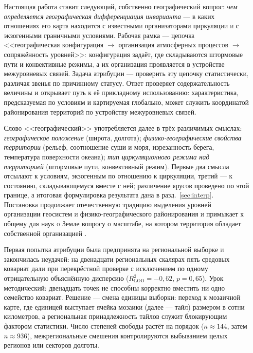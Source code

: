 \documentclass[11pt,a4paper]{article}
\begin{document}
Настоящая работа ставит следующий, собственно географический вопрос: \emph{чем определяется географическая дифференциация инварианта} --- в каких отношениях его карта находится с известными организаторами циркуляции и с экзогенными граничными условиями. Рабочая рамка --- цепочка <<географическая конфигурация $\to$ организация атмосферных процессов $\to$ сопряжённость уровней>>: конфигурация задаёт, где складываются штормовые пути и конвективные режимы, а их организация проявляется в устройстве межуровневых связей. Задача атрибуции --- проверить эту цепочку статистически, различая звенья по причинному статусу. Ответ проверяет содержательность величины и открывает путь к её прикладному использованию: характеристика, предсказуемая по условиям и картируемая глобально, может служить координатой районирования территорий по устройству межуровневых связей.

Слово <<географический>> употребляется далее в трёх различимых смыслах: \emph{географическое положение} (широта, долгота); \emph{физико-географические свойства территории} (рельеф, соотношение суши и моря, изрезанность берега, температура поверхности океана); \emph{тип циркуляционного режима над территорией} (штормовые пути, конвективный режим). Первые два смысла отсылают к условиям, экзогенным по отношению к циркуляции, третий --- к состоянию, складывающемуся вместе с ней; различение ярусов проведено по этой границе, а итоговая формулировка результата дана в разд.~\ref{sec:interp}. Постановка продолжает отечественную традицию выделения уровней организации геосистем и физико-географического районирования \cite{Sochava1978,Isachenko1991,Bertrand1968} и примыкает к общему для наук о Земле вопросу о масштабе, на котором территория обладает собственной организацией \cite{Simon1962,Levin1992,WuLoucks1995}.

Первая попытка атрибуции была предпринята на региональной выборке и закончилась неудачей: на двенадцати региональных скалярах пять средовых ковариат дали при перекрёстной проверке с исключением по одному отрицательную объяснённую дисперсию ($R^2_{\mathrm{LOO}}=-0{,}62$, $p=0{,}65$). Урок методический: двенадцать точек не способны корректно вместить ни одно семейство ковариат. Решение --- смена единицы выборки: переход к мозаичной карте, где единицей выступает ячейка мозаики (далее --- тайл) размером в сотни километров, а региональная принадлежность тайлов служит блокирующим фактором статистики. Число степеней свободы растёт на порядок ($n\approx144$, затем $n\approx936$), межрегиональные смешения контролируются выбыванием целых регионов или секторов долготы.
\end{document}
